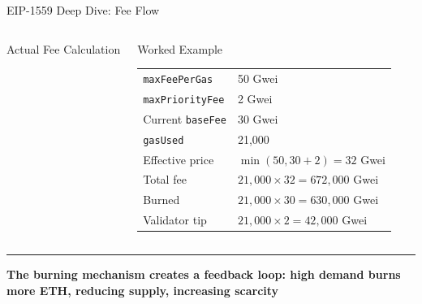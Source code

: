 \documentclass[8pt,aspectratio=169]{beamer}
\newcommand{\bottomnote}[1]{\vfill\vspace{-2mm}\textcolor{mllavender2}{\rule{\textwidth}{0.4pt}}\vspace{1mm}\footnotesize\textbf{#1}}
\begin{document}
\begin{frame}{EIP-1559 Deep Dive: Fee Flow}
\begin{columns}
\begin{block}{Actual Fee Calculation}
\end{block}
\begin{block}{Worked Example}
\small
\begin{tabular}{@{}ll@{}}
\texttt{maxFeePerGas} & 50 Gwei \\
\texttt{maxPriorityFee} & 2 Gwei \\
Current \texttt{baseFee} & 30 Gwei \\
\texttt{gasUsed} & 21,000 \\
\midrule
Effective price & $\min(50, 30+2) = 32$ Gwei \\
Total fee & $21{,}000 \times 32 = 672{,}000$ Gwei \\
Burned & $21{,}000 \times 30 = 630{,}000$ Gwei \\
Validator tip & $21{,}000 \times 2 = 42{,}000$ Gwei \\
\end{tabular}
\end{block}
\end{columns}
\bottomnote{The burning mechanism creates a feedback loop: high demand burns more ETH, reducing supply, increasing scarcity}
\end{frame}
\end{document}
